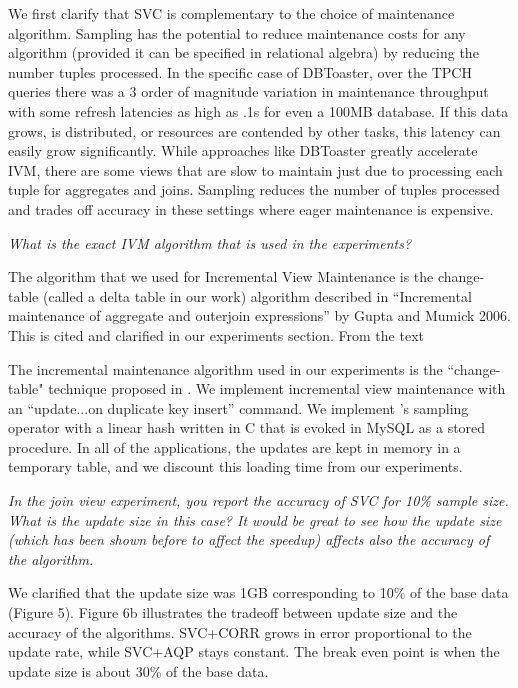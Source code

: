 We first clarify that SVC is complementary to the choice of maintenance algorithm. Sampling has the potential to reduce maintenance costs for any algorithm (provided it can be specified in relational algebra) by reducing the number tuples processed. In the specific case of DBToaster, over the TPCH queries there was a 3 order of magnitude variation in maintenance throughput with some refresh latencies as high as .1s for even a 100MB database. If this data grows, is distributed, or resources are contended by other tasks, this latency can easily grow significantly. While approaches like DBToaster greatly accelerate IVM, there are some views that are slow to maintain just due to processing each tuple for aggregates and joins. Sampling reduces the number of tuples processed and trades off accuracy in these settings where eager maintenance is expensive.

\vspace{1em}
\emph{What is the exact IVM algorithm that is used in the experiments?}

The algorithm that we used for Incremental View Maintenance is the change-table (called a delta table in our work) algorithm described in “Incremental maintenance of aggregate and outerjoin expressions” by Gupta and Mumick 2006. This is cited and clarified in our experiments section. From the text\begin{displayquote} 
The incremental maintenance algorithm used in our experiments is the ``change-table" technique proposed in \cite{gupta2006incremental}. We implement incremental view maintenance with an ``update...on duplicate key insert'' command. We implement \svc's sampling operator with a linear hash written in C that is evoked in MySQL as a stored procedure. In all of the applications, the updates are kept in memory in a temporary table, and we discount this loading time from our experiments.\end{displayquote} 


\vspace{1em}
\emph{In the join view experiment, you report the accuracy of SVC for 10\% sample size. What is the update size in this case? It would be great to see how the update size (which has been shown before to affect the speedup) affects also the accuracy of the algorithm.}

We clarified that the update size was 1GB corresponding to 10\% of the base data (Figure 5). Figure 6b illustrates the tradeoff between update size and the accuracy of the algorithms. SVC+CORR grows in error proportional to the update rate, while SVC+AQP stays constant. The break even point is when the update size is about 30\% of the base data. 

